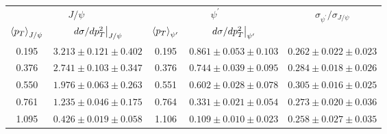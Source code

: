 \begin{tabular}{cc|cc|c}
\hline
\multicolumn{2}{c|}{$J/\psi$} &
  \multicolumn{2}{c|}{$\psi^{\prime}$} &
  \multirow{2}{*}{$\sigma_{\psi^\prime}/\sigma_{J/\psi}$} \\ \cline{1-4}
$\expval{p_T}_{J/\psi}$ &
  $\eval{d\sigma/dp^2_T}_{J/\psi}$ &
  $\expval{p_T}_{\psi^\prime}$ &
  $\eval{d\sigma/dp^2_T}_{\psi^\prime}$ &
   \\ \hline
0.195 & $3.213\pm0.121\pm0.402$ & 0.195 & $0.861\pm0.053\pm0.103$ & $0.262\pm0.022\pm0.023$ \\
0.376 & $2.741\pm0.103\pm0.347$ & 0.376 & $0.744\pm0.039\pm0.095$ & $0.284\pm0.018\pm0.026$ \\
0.550 & $1.976\pm0.063\pm0.263$ & 0.551 & $0.602\pm0.028\pm0.078$ & $0.305\pm0.016\pm0.025$ \\
0.761 & $1.235\pm0.046\pm0.175$ & 0.764 & $0.331\pm0.021\pm0.054$ & $0.273\pm0.020\pm0.036$ \\
1.095 & $0.426\pm0.019\pm0.058$ & 1.106 & $0.109\pm0.010\pm0.023$ & $0.258\pm0.027\pm0.035$ \\ \hline
\end{tabular}
